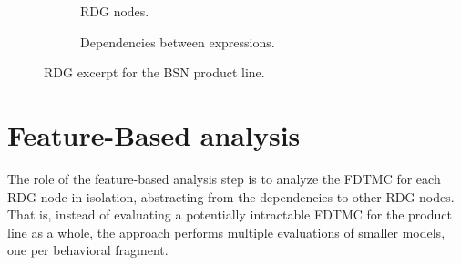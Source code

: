 \begin{figure}[!hbt] 
  \centering 
  \begin{subfigure}[t]{0.50\columnwidth}
    \centering 
    \resizebox{\linewidth}{!}{
	    \centering 
	    
    }    
    \caption{RDG nodes.} 
    \label{fig:rdgOxygenation}	
  \end{subfigure}
  \vspace{1cm}

  \begin{subfigure}[t]{0.80\columnwidth} 
    \resizebox{\linewidth}{!}{
	    \centering 
	    
    }    
    \caption{Dependencies between expressions.} 
    \label{fig:formulaeDependencies}
  \end{subfigure}
  \vspace{0.3cm} \caption{RDG excerpt for the BSN product line.}
  \label{fig:bsnRdg}
\end{figure}







\section{Feature-Based analysis \label{sec:featureBasedAnalysis}}


The role of the feature-based analysis step is to analyze the FDTMC for each RDG
node in isolation, abstracting from the dependencies to other RDG nodes.  That
is, instead of evaluating a potentially intractable FDTMC for the product line
as a whole, the approach performs multiple evaluations of smaller models, one
per behavioral fragment.

